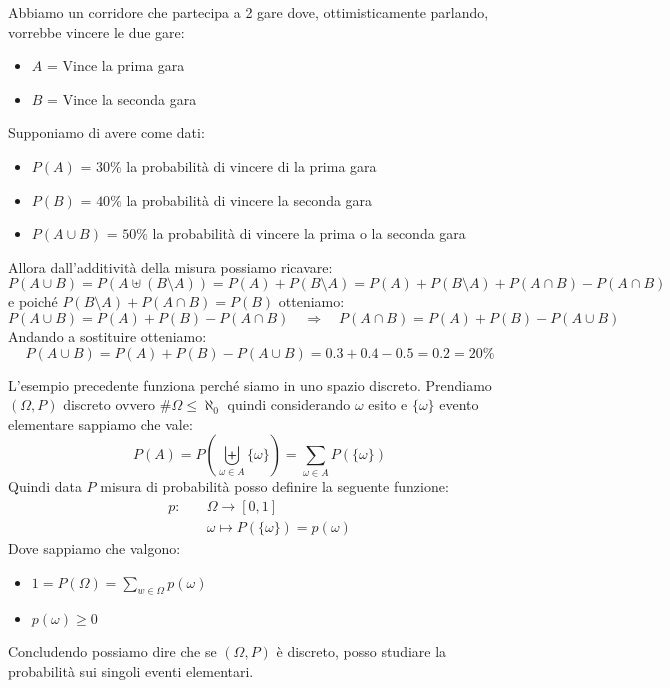 \documentclass[11pt, a4paper, twoside]{article}
\begin{document}
\begin{es}\label{Corridore}
	Abbiamo un corridore che partecipa a 2 gare dove, ottimisticamente parlando, vorrebbe vincere le due gare:
	\begin{itemize}
		\item $A$ = Vince la prima gara
		\item $B$ = Vince la seconda gara
	\end{itemize}
	Supponiamo di avere come dati:
	\begin{itemize}
		\item $P(A)$ = $30\%$ la probabilità di vincere di la prima gara
		\item $P(B)$ = $40\%$ la probabilità di vincere la seconda gara
		\item $P(A\cup B)$ = $50\%$ la probabilità di vincere la prima o la seconda gara
	\end{itemize}

	\begin{center}
	\end{center}

	Allora dall'additività della misura possiamo ricavare:
		\[
			P(A\cup B)=P(A\uplus (B\setminus A))= P(A)+P(B\setminus A)=P(A)+P(B\setminus A)+P(A\cap B)- P(A\cap B)
		\]
	e poiché $P(B\setminus A)+P(A\cap B)=P(B)$ otteniamo:
		\[
			P(A\cup B)=P(A)+P(B)- P(A\cap B)\quad \Rightarrow\quad P(A\cap B)=P(A)+P(B)-P(A\cup B)
		\]
	Andando a sostituire otteniamo:
		\[
			P(A\cup B)=P(A)+P(B)-P(A\cup B)=0.3+0.4-0.5=0.2=20\%
		\]
\end{es}

\begin{oss}
	L'esempio precedente funziona perché siamo in uno spazio discreto. Prendiamo $(\Omega,P)$ discreto ovvero $\#\Omega\leq\aleph_0$ quindi considerando $\omega$ esito e $\{\omega\}$ evento elementare sappiamo che vale:
	\[
		P(A)=P\left(\biguplus\limits_{\omega\in A} \{\omega\}\right)=\sum\limits_{\omega\in A}P(\{\omega\})
	\]
	Quindi data $P$ misura di probabilità posso definire la seguente funzione:
	\begin{align*}
		p:\quad&\Omega\rightarrow[0,1]\\
		&\omega\mapsto P(\{\omega\})=p(\omega)
	\end{align*}
	Dove sappiamo che valgono:
	\begin{itemize}
		\item $1=P(\Omega)=\sum\limits_{w\in\Omega} p(\omega)$
		\item $p(\omega)\geq 0$
	\end{itemize}
	Concludendo possiamo dire che se $(\Omega,P)$ è discreto, posso studiare la probabilità sui singoli eventi elementari.
\end{oss}
\end{document}
